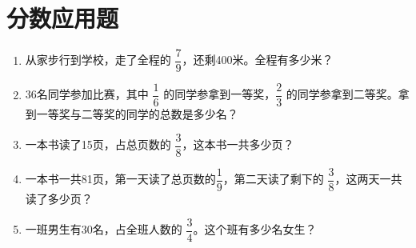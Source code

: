 \documentclass[12pt]{article}
\begin{document}
\section*{分数应用题}
\begin{enumerate}[label=\arabic*.] 
    \item 从家步行到学校，走了全程的 $\dfrac{7}{9}$，还剩400米。全程有多少米？ 
    \item 36名同学参加比赛，其中 $\dfrac{1}{6}$ 的同学参拿到一等奖，$\dfrac{2}{3}$ 的同学参拿到二等奖。拿到一等奖与二等奖的同学的总数是多少名？
    \item 一本书读了15页，占总页数的 $\dfrac{3}{8}$，这本书一共多少页？ 
    \item 一本书一共81页，第一天读了总页数的$\dfrac{1}{9}$，第二天读了剩下的 $\dfrac{3}{8}$，这两天一共读了多少页？
    \item 一班男生有30名，占全班人数的 $\dfrac{3}{4}$。这个班有多少名女生？ 
    
\end{enumerate}
\end{document}

